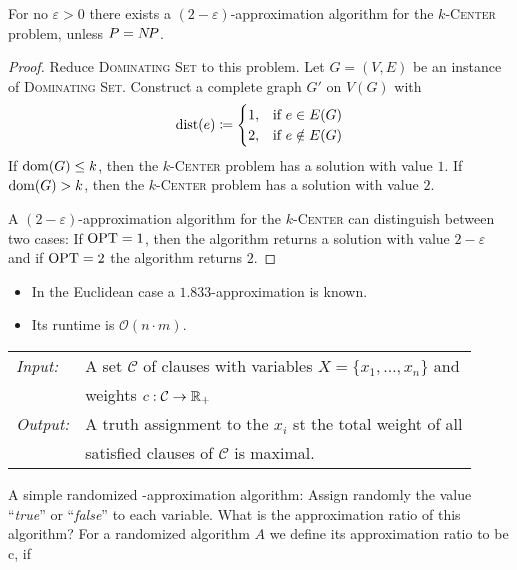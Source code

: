 \documentclass[../skript.tex]{subfiles}
\begin{document}
\begin{theorem} %
\label{thm:26}
For no $\varepsilon > 0$ there exists a $(2-\varepsilon)$-approximation algorithm for the \textsc{$k$-Center} problem, unless $P = N \! P$.
\end{theorem}
\begin{proof}
Reduce \textsc{Dominating Set} to this problem.
Let $G = (V, E)$ be an instance of \textsc{Dominating Set}.
Construct a complete graph $G'$ on $V(G)$ with
\[
	\operatorname*{dist}(e) \coloneqq \begin{cases}
	1, & \text{if } e \in E(G) \\
	2, & \text{if } e \notin E(G) \\
	\end{cases}
\]
If $\operatorname{dom}(G) \leq k$, then the \textsc{$k$-Center} problem has a solution with value $1$.
If $\operatorname{dom}(G) > k$, then the \textsc{$k$-Center} problem has a solution with value $2$.

A $(2-\varepsilon)$-approximation algorithm for the \textsc{$k$-Center} can distinguish between two cases: If $\operatorname{OPT} = 1$, then the algorithm returns a solution with value $2 - \varepsilon$ and if $\operatorname{OPT} = 2$ the algorithm returns $2$.
\end{proof}
\begin{remark}
\begin{itemize}
\item In the Euclidean case a $1.833$-approximation is known.
\item Its runtime is $\mathcal{O}(n\cdot m)$.
\end{itemize}
\end{remark}
\begin{problem}
\begin{tabular}{ll}
\textit{Input:} & A set $\mathcal{C}$ of clauses with variables $X = \{ x_1, \ldots, x_n \}$ and \\
& weights $c : \mathcal{C} \to \mathbb{R}_+$ \\
\textit{Output:} & A truth assignment to the $x_i$ \ac{st} the total weight of all \\
& satisfied clauses of $\mathcal{C}$ is maximal.
\end{tabular}
\end{problem}
A simple randomized -approximation algorithm: Assign randomly the value ``\textit{true}'' or ``\textit{false}'' to each variable.
What is the approximation ratio of this algorithm?\tabularnewline
For a randomized algorithm $A$ we define its approximation ratio to be c, if
\end{document}
